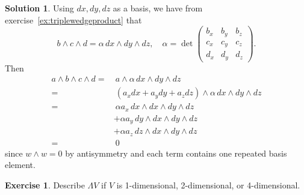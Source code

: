 \documentclass[11pt, a4paper]{article}
\theoremstyle{definition}
\newtheorem{ex}{Exercise}[part]
\newtheorem{sol}{Solution}[part]
\begin{document}
\begin{sol}

Using $dx, dy, dz$ as a basis, we have from exercise~\ref{ex:triplewedgeproduct} that
\[
    b \wedge c \wedge d = \alpha \, dx \wedge dy \wedge dz, \quad
    \alpha = \det \begin{pmatrix}
        b_x & b_y & b_z \\
        c_x & c_y & c_z \\
        d_x & d_y & d_z
    \end{pmatrix}.
\]
Then
\begin{align*}
    a \wedge b \wedge c \wedge d =&\ a \wedge \alpha \, dx \wedge dy \wedge dz \\
        =&\ (a_x dx + a_y dy + a_z dz) \wedge \alpha \, dx \wedge dy \wedge dz \\
        =&\ \alpha a_x \, dx \wedge dx \wedge dy \wedge dz \\
        &+ \alpha a_y \, dy \wedge dx \wedge dy \wedge dz \\
        &+ \alpha a_z \, dz \wedge dx \wedge dy \wedge dz \\
        =&\ 0
\end{align*}
since $w \wedge w = 0$ by antisymmetry and each term contains one repeated basis element.

\end{sol}

\begin{ex}

Describe $\Lambda V$ if $V$ is 1-dimensional, 2-dimensional, or 4-dimensional.

\end{ex}
\end{document}
